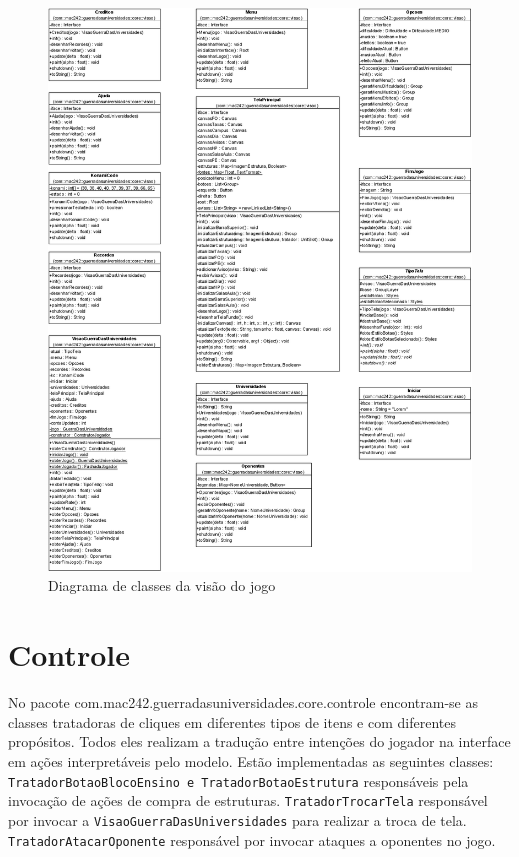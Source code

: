 \documentclass[brazil,times]{abnt}
\begin{document}
\begin{figure}[htp]
\begin{center}
  \includegraphics[width=\textwidth]{imagens/TipoTela.png}
  \caption[Diagrama de classes da visão do jogo]{Diagrama de
  classes da visão do jogo}
  \label{modelo-basico}
\end{center}
\end{figure}


\section{Controle}
No pacote com.mac242.guerradasuniversidades.core.controle encontram-se as
classes tratadoras de cliques em diferentes tipos de itens e com diferentes
propósitos. Todos eles realizam a tradução entre intenções do jogador na
interface em ações interpretáveis pelo modelo. Estão implementadas as seguintes
classes: \texttt{TratadorBotaoBlocoEnsino e TratadorBotaoEstrutura} responsáveis
pela invocação de ações de compra de estruturas. \texttt{TratadorTrocarTela}
responsável por invocar a \texttt{VisaoGuerraDasUniversidades} para realizar a
troca de tela. \texttt{TratadorAtacarOponente} responsável por invocar ataques a
oponentes no jogo.
\end{document}
